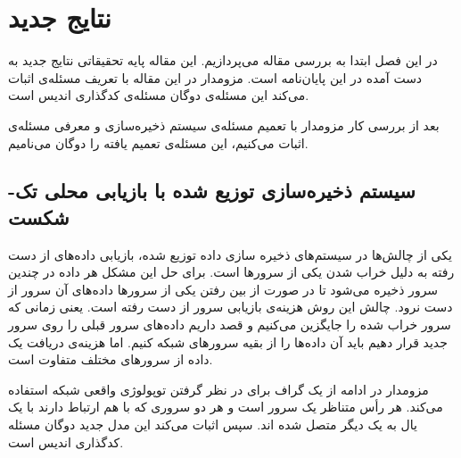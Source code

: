 \chapter{نتایج جدید}
\label{chapter:results}
در این فصل ابتدا به بررسی مقاله
\cite{arya}
 می‌پردازیم. این مقاله پایه تحقیقاتی نتایج جدید به دست آمده در این پایان‌نامه است. مزومدار در این مقاله با تعریف مسئله‌ی
اثبات می‌کند این مسئله‌ی دوگان مسئله‌ی کدگذاری اندیس است.

بعد از بررسی کار مزومدار با تعمیم مسئله‌ی سیستم ذخیره‌سازی و معرفی مسئله‌ی
 اثبات می‌کنیم، این مسئله‌ی تعمیم یافته را دوگان 
 \lpicod
  می‌نامیم.
\newpage

\section{
سیستم ذخیره‌سازی توزیع شده با بازیابی محلی تک-شکست \SFRDSS
}
یکی از چالش‌ها در سیستم‌های ذخیره سازی داده توزیع شده، بازیابی داده‌های از دست رفته به دلیل خراب شدن یکی از سرورها است. 
برای حل این مشکل هر داده در چندین سرور ذخیره می‌شود تا در صورت از بین رفتن یکی از سرورها داده‌های آن سرور از دست نرود. چالش این روش هزینه‌ی بازیابی سرور از دست رفته است. یعنی زمانی که سرور خراب شده را جایگزین می‌کنیم و قصد داریم داده‌های سرور قبلی را روی سرور جدید قرار دهیم باید آن داده‌ها را از بقیه سرورهای شبکه 
کنیم. اما هزینه‌ی دریافت یک داده از سرورهای مختلف متفاوت است.

 
 مزومدار در ادامه از یک گراف برای در نظر گرفتن توپولوژی واقعی شبکه استفاده می‌کند. هر رأس متناظر یک سرور است و هر دو سروری که با هم ارتباط دارند با یک یال به یک دیگر متصل شده اند. سپس اثبات می‌کند این مدل جدید دوگان مسئله کدگذاری اندیس است.
 
